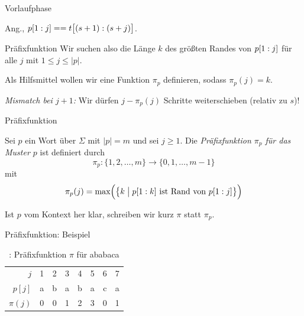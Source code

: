 \documentclass[xcolor=dvipsnames, aspectratio=169]{beamer}
\begin{document}
\begin{frame}{Vorlaufphase}
\begin{center}
{}
\end{center}
Ang., $p[1: j] == t\big[(s+1):(s+j)\big]$. 
\end{frame}

\begin{frame}{Präfixfunktion}
Wir suchen also die Länge $k$ des größten Randes von $p[1: j]$ für alle $j$ mit $1\leq j\leq\vert p\vert$.\bigskip\pause

Als Hilfsmittel wollen wir eine Funktion $\pi_p$ definieren, sodass $\pi_p(j)=k$.\bigskip\pause

\textit{Mismatch bei $j+1$:} Wir dürfen $j-\pi_p(j)$ Schritte weiterschieben (relativ zu $s$)!
\end{frame}

\begin{frame}{Präfixfunktion}
\begin{defi}
Sei $p$ ein Wort über $\Sigma$ mit $\vert p\vert=m$ und sei $j\geq 1$. Die \emph{Präfixfunktion $\pi_p$ für das Muster $p$} ist definiert durch \[\pi_p\colon\{1,2,\dots,m\}\to\{0,1,\dots,m-1\}\] mit
\[\pi_p(j)=\mathrm{max}\Big(\big\{k\;\big\vert\;p[1: k]\text{ ist Rand von }p[1: j]\big\}\Big)\]
\end{defi}\medskip

Ist $p$ vom Kontext her klar, schreiben wir kurz $\pi$ statt $\pi_p$.
\end{frame}

\begin{frame}[label=prefix]{Präfixfunktion: Beispiel}
\begin{table}\setlength\extrarowheight{.3em}
\begin{tabular}{r@{\hskip 2em}ccccccc}
\toprule
$j$ & 1 & 2 & 3 & 4 & 5 & 6 & 7 \\ 
$p[j]$ & a & b & a & b & a & c & a \\ 
$\pi(j)$ & 0 & 0 & 1 & 2 & 3 & 0 & 1 \\ 
\bottomrule
\end{tabular}
\caption{\cite{cormenalgorithms2009}: Präfixfunktion $\pi$ für ababaca}
\end{table}
\end{frame}
\end{document}
